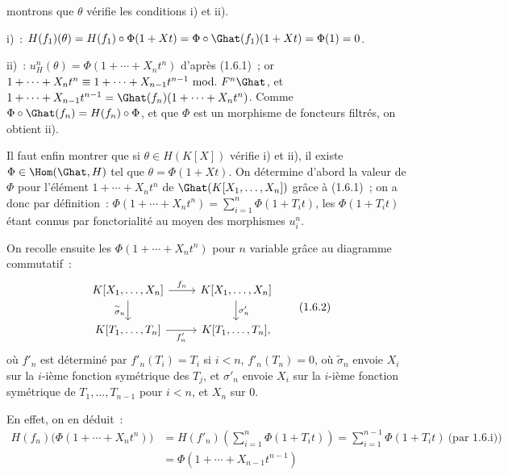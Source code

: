 montrons que \(\theta\) vérifie les conditions i) et ii).

i)~: \(H(f_1)(\theta)=H(f_1)\circ\Phi(1+Xt)=\Phi\circ\Ghat(f_1)(1+Xt)=\Phi(1)=0\).

ii)~: \(u_H^n(\theta)=\Phi(1+\cdots+X_nt^n)\) d'après (1.6.1)~; or \(1+\cdots+X_nt^n\equiv 1+\cdots+X_{n-1}t^{n-1}\ \mathrm{mod.}\ F^n\Ghat\), et \(1+\cdots+X_{n-1}t^{n-1}=\Ghat(f_n)(1+\cdots+X_nt^n)\). Comme \(\Phi\circ\Ghat(f_n)=H(f_n)\circ\Phi\), et que \(\Phi\) est un morphisme de foncteurs filtrés, on obtient ii).

Il faut enfin montrer que si \(\theta\in H(K[X])\) vérifie i) et ii), il existe \(\Phi\in\Hom(\Ghat,H)\) tel que \(\theta=\Phi(1+Xt)\).
On détermine d'abord la valeur de \(\Phi\) pour l'élément \(1+\cdots+X_nt^n\) de \(\Ghat(K[X_1,\ldots,X_n])\) grâce à (1.6.1)~; on a donc par définition~: \(\Phi(1+\cdots+X_nt^n)=\sum\limits_{i=1}^n \Phi(1+T_it)\), les \(\Phi(1+T_it)\) étant connus par fonctorialité au moyen des morphismes \(u_i^n\).

On recolle ensuite les \(\Phi(1+\cdots+X_nt^n)\) pour \(n\) variable grâce au diagramme commutatif~:
\[
\begin{tikzcd}
K[X_1,\ldots,X_n] \arrow[r,"f_n"] \arrow[d,"\widetilde{\sigma}_n"'] &
K[X_1,\ldots,X_n] \arrow[d,"\sigma'_n"]\\
K[T_1,\ldots,T_n] \arrow[r,"f'_n"'] &
K[T_1,\ldots,T_n],
\end{tikzcd}
\tag{1.6.2}
\]
où \(f'_n\) est déterminé par \(f'_n(T_i)=T_i\) si \(i<n\), \(f'_n(T_n)=0\), où \(\widetilde{\sigma}_n\) envoie \(X_i\) sur la \(i\)-ième fonction symétrique des \(T_j\), et \(\sigma'_n\) envoie \(X_i\) sur la \(i\)-ième fonction symétrique de \(T_1,\ldots,T_{n-1}\) pour \(i<n\), et \(X_n\) sur \(0\).

En effet, on en déduit~:
\[
\begin{aligned}
H(f_n)\bigl(\Phi(1+\cdots+X_nt^n)\bigr)
&=H(f'_n)\left(\sum_{i=1}^n \Phi(1+T_it)\right)
=\sum_{i=1}^{n-1}\Phi(1+T_it)\ \text{(par 1.6.i))}\\
&=\Phi(1+\cdots+X_{n-1}t^{n-1})
\end{aligned}
\]
